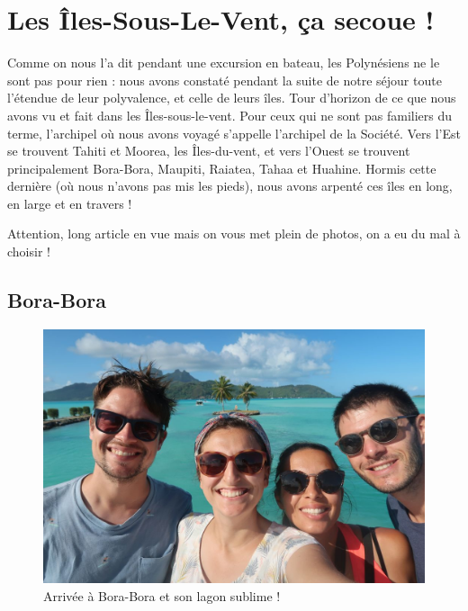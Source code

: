 \hypertarget{les-uxeeles-sous-le-vent-uxe7a-secoue}{%
\section{Les Îles-Sous-Le-Vent, ça secoue
!}\label{les-uxeeles-sous-le-vent-uxe7a-secoue}}

Comme on nous l'a dit pendant une excursion en bateau, les Polynésiens
ne le sont pas pour rien : nous avons constaté pendant la suite de notre
séjour toute l'étendue de leur polyvalence, et celle de leurs îles. Tour
d'horizon de ce que nous avons vu et fait dans les Îles-sous-le-vent.
Pour ceux qui ne sont pas familiers du terme, l'archipel où nous avons
voyagé s'appelle l'archipel de la Société. Vers l'Est se trouvent Tahiti
et Moorea, les Îles-du-vent, et vers l'Ouest se trouvent principalement
Bora-Bora, Maupiti, Raiatea, Tahaa et Huahine. Hormis cette dernière (où
nous n'avons pas mis les pieds), nous avons arpenté ces îles en long, en
large et en travers !

\hypertarget{mapid}{}

Attention, long article en vue mais on vous met plein de photos, on a eu
du mal à choisir !

\hypertarget{bora-bora}{%
\subsection{Bora-Bora}\label{bora-bora}}

\begin{figure}
\centering
\includegraphics{images/20180820_boraselfie.JPG}
\caption{Arrivée à Bora-Bora et son lagon sublime !}
\end{figure}


